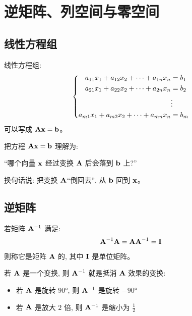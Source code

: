 
\chapter{逆矩阵、列空间与零空间}
\label{ch:inverse}

\begin{abstract}
在本章中, 我们将学习逆矩阵 (inverse matrix)、线性方程组的求解, 以及与矩阵相关的重要空间 (列空间、零空间和秩)。
\end{abstract}

\section{线性方程组}

\begin{definition}[方程组的矩阵形式]
线性方程组:
\[
\left\{\begin{aligned} 
a_{11}x_1 + a_{12}x_2 + \cdots + a_{1n}x_n &= b_1 \\
a_{21}x_1 + a_{22}x_2 + \cdots + a_{2n}x_n &= b_2 \\
&\vdots \\
a_{m1}x_1 + a_{m2}x_2 + \cdots + a_{mn}x_n &= b_m
 \end{aligned}\right.
\]
可以写成 $\mathbf{A}\mathbf{x} = \mathbf{b}$。
\end{definition}

\begin{intuition}
把方程 $\mathbf{A}\mathbf{x} = \mathbf{b}$ 理解为:
\begin{center}
``哪个向量 $\mathbf{x}$ 经过变换 $\mathbf{A}$ 后会落到 $\mathbf{b}$ 上?''
\end{center}
换句话说: 把变换 $\mathbf{A}$``倒回去'', 从 $\mathbf{b}$ 回到 $\mathbf{x}$。
\end{intuition}

\section{逆矩阵}

\begin{definition}[逆矩阵]
若矩阵 $\mathbf{A}^{-1}$ 满足:
\[
\mathbf{A}^{-1} \mathbf{A} = \mathbf{A} \mathbf{A}^{-1} = \mathbf{I}
\]
则称它是矩阵 $\mathbf{A}$ 的, 其中 $\mathbf{I}$ 是单位矩阵。
\end{definition}

\begin{intuition}
若 $\mathbf{A}$ 是一个变换, 则 $\mathbf{A}^{-1}$ 就是抵消 $\mathbf{A}$ 效果的变换:
\begin{itemize}
    \item 若 $\mathbf{A}$ 是旋转 $90°$, 则 $\mathbf{A}^{-1}$ 是旋转 $-90°$
    \item 若 $\mathbf{A}$ 是放大 $2$ 倍, 则 $\mathbf{A}^{-1}$ 是缩小为 $\frac{1}{2}$
\end{itemize}
\end{intuition}

